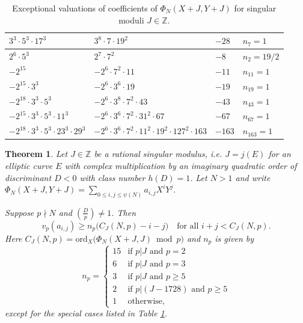 \documentclass[11pt]{amsart}
\newtheorem{thm}[prop]{Theorem}
\theoremstyle{definition}
\newcommand{\ord}{\mathrm{ord}}
\def\BZ{\mathbb{Z}}
\begin{document}
\begin{table}[h]
{\begin{tabular}{|l|l|l|l|}
        $3^{3} \cdot 5^{3} \cdot 17^{3}$ & $3^{8} \cdot 7 \cdot 19^{2}$ & $-28$ & 
        $n_7 = 1$ \\ \hline
        
        $2^{6} \cdot 5^{3}$ & $2^{7} \cdot 7^{2}$ & $-8$ & $n_2 = 19/2$ \\ \hline
        
        $- 2^{15}$ & $- 2^{6} \cdot 7^{2} \cdot 11$ & $-11$ & 
        $n_{11} = 1$ \\ \hline
        
        $- 2^{15} \cdot 3^{3}$ & $- 2^{6} \cdot 3^{6} \cdot 19$ & $-19$ & 
        $n_{19} = 1$ \\ \hline
        
        $- 2^{18} \cdot 3^{3} \cdot 5^{3}$ & $- 2^{6} \cdot 3^{8} \cdot 7^{2} \cdot 43$ & $-43$ & $n_{43} = 1$ \\ \hline
        
        $- 2^{15} \cdot 3^{3} \cdot 5^{3} \cdot 11^{3}$ & $- 2^{6} \cdot 3^{6} \cdot 7^{2} \cdot 31^{2} \cdot 67$ & $-67$ & $n_{67} = 1$ \\ \hline
        
        $- 2^{18} \cdot 3^{3} \cdot 5^{3} \cdot 23^{3} \cdot 29^{3}$ & $- 2^{6} \cdot 3^{6} \cdot 7^{2} \cdot 11^{2} \cdot 19^{2} \cdot 127^{2} \cdot 163$ & $-163$ & 
        $n_{163} = 1$ \\ \hline     
    \end{tabular}
    \caption{Exceptional valuations of coefficients of $\Phi_N(X+J, Y+J)$ for singular moduli $J\in\BZ$.}
    \label{tab:rationalJ}
    }
\end{table}

\vspace{-5mm}
\begin{thm}\label{thm:rationalJ}
    Let $J \in\BZ$ be a rational singular modulus, i.e. $J=j(E)$ for an elliptic curve $E$ with complex multiplication by an imaginary quadratic order of discriminant $D < 0$ with class number $h(D)=1$. 
    Let $N>1$ and write $\Phi_N(X+J, Y+J) = \sum_{0\leq i,j \leq \psi(N)}a_{i,j}X^iY^j.$

    Suppose $p\nmid N$ and $\left(\frac{D}{p}\right) \neq 1$. Then 
    \[
    v_p(a_{i,j}) \geq n_p\big(C_J(N,p) - i-j\big)\quad\text{for all $i+j < C_J(N,p)$.}
    \]
    Here $C_J(N,p) = \ord_X\big(\Phi_N(X+J,J) \bmod p\big)$ and
    $n_p$ is given by
    \[
    n_p = \left\{
    \begin{array}{ll}
        15 & \text{if $p|J$ and $p=2$} \\
        6 & \text{if $p|J$ and $p=3$} \\
        3 & \text{if $p|J$ and $p\geq 5$}  \\
        2 & \text{if $p|(J-1728)$ and $p\geq 5$} \\
        1 & \text{otherwise,}
    \end{array}
    \right.
    \]
    except for the special cases listed in Table \ref{tab:rationalJ}.
\end{thm}
\end{document}

